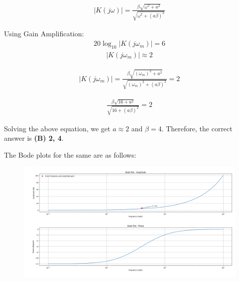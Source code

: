 \documentclass[journal,12pt,twocolumn]{IEEEtran}
\theoremstyle{remark}
\begin{document}
    \begin{align}
    |K(j\omega)| =\frac{\beta \sqrt{\omega^2 + a^2}}{\sqrt{\omega^2 + (a\beta)^2}}
    \end{align}
    
    Using Gain Amplification:
    \begin{align}
     20\log_{10}|K(j\omega_m)| = 6
     \end{align}
     \begin{align}
     |K(j\omega_m)| \approx  2
     \end{align}
     
    \begin{align}
    |K(j\omega_m)| =\frac{\beta \sqrt{(\omega_m)^2 + a^2}}{\sqrt{(\omega_m)^2 + (a\beta)^2}}=2
    \end{align}
    
    \begin{align}
    \frac{\beta \sqrt{16 + a^2}}{\sqrt{16 + (a\beta)^2}}=2
    \end{align}
    
    Solving the above equation, we get \(a \approx 2\) and \(\beta = 4\). Therefore, the correct answer is \textbf{(B) 2, 4}.
    
    The Bode plots for the same are as follows:
    \begin{figure}[h!]
  \centering
  \includegraphics[width=\columnwidth]{figs/bode.png}
  \label{fig:bode_Plot}
\end{figure}
\end{document}
